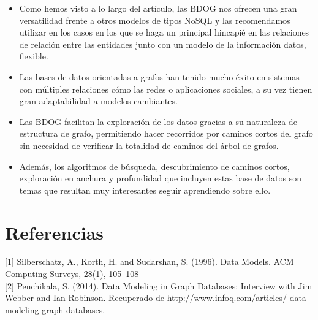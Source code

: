 \documentclass[preprint,12pt]{elsarticle}
\begin{document}
\begin{itemize}

\item Como hemos visto a lo largo del artículo, las BDOG nos ofrecen una gran versatilidad frente a otros modelos de tipos NoSQL y las recomendamos utilizar en los casos en los que se haga un principal hincapié en las relaciones de relación entre las entidades junto con un modelo de la información datos, flexible. \\

\item Las bases de datos orientadas a grafos han tenido mucho éxito en sistemas con múltiples relaciones cómo las redes o aplicaciones sociales, a su vez tienen gran adaptabilidad a modelos cambiantes. \\ 

\item Las BDOG facilitan la exploración de los datos gracias a su naturaleza de estructura de grafo, permitiendo hacer recorridos por caminos cortos del grafo sin necesidad de verificar la totalidad de caminos del árbol de grafos. \\ 

\item Además, los algoritmos de búsqueda, descubrimiento de caminos cortos, exploración en anchura y profundidad que incluyen estas base de datos son temas que resultan muy interesantes seguir aprendiendo sobre ello. \\ 
\end{itemize}


	
\section{Referencias}

[1] Silberschatz, A., Korth, H. and Sudarshan, S. (1996).
Data Models. ACM Computing Surveys, 28(1),
105–108 \\

[2] Penchikala, S. (2014). Data Modeling in Graph Databases: Interview with Jim Webber and Ian Robinson. Recuperado de http://www.infoq.com/articles/
data-modeling-graph-databases.
	


	
\end{document}
